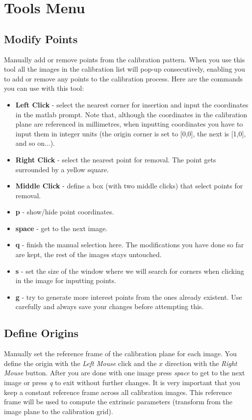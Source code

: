 \documentclass[article,11pt]{memoir}
\begin{document}
\section{Tools Menu}
\subsection{Modify Points}
Manually add or remove points from the calibration pattern. When you use this tool all the images in the calibration list will pop-up consecutively, enabling you to add or remove any points to the calibration process. Here are the commands you can use with this tool:
\begin{itemize}
 \item \textbf{Left Click} - select the nearest corner for insertion and input the coordinates in the matlab prompt. Note that, although the coordinates in the calibration plane are referenced in millimetres, when inputting coordinates you have to input them in integer units (the origin corner is set to [0,0], the next is [1,0], and so on...).    
 \item \textbf{Right Click} - select the nearest point for removal. The point gets surrounded by a yellow square.
 \item \textbf{Middle Click} - define a box (with two middle clicks) that select points for removal.
 \item \textbf{p} - show/hide point coordinates.
 \item \textbf{space} - get to the next image.
 \item \textbf{q} - finish the manual selection here. The modifications you have done so far are kept, the rest of the images stays untouched.
 \item \textbf{s} - set the size of the window where we will search for corners when clicking in the image for inputting points.
 \item \textbf{g} - try to generate more interest points from the ones already existent. Use carefully and always save your changes before attempting this. 
\end{itemize}

\subsection{Define Origins}
Manually set the reference frame of the calibration plane for each image. You define the origin with the \textit{Left Mouse} click and the $x$ direction with the \textit{Right Mouse} button. After you are done with one image press \textit{space} to get to the next image or press \textit{q} to exit without further changes. It is very important that you keep a constant reference frame across all calibration images. This reference frame will be used to compute the extrinsic parameters (transform from the image plane to the calibration grid).
\end{document}
